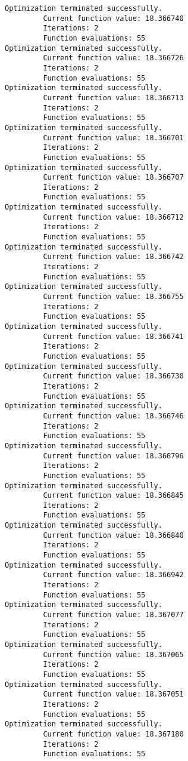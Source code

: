 \documentclass[11pt]{article}
\begin{document}
\begin{Verbatim}[commandchars=\\\{\}]
Optimization terminated successfully.
         Current function value: 18.366740
         Iterations: 2
         Function evaluations: 55
Optimization terminated successfully.
         Current function value: 18.366726
         Iterations: 2
         Function evaluations: 55
Optimization terminated successfully.
         Current function value: 18.366713
         Iterations: 2
         Function evaluations: 55
Optimization terminated successfully.
         Current function value: 18.366701
         Iterations: 2
         Function evaluations: 55
Optimization terminated successfully.
         Current function value: 18.366707
         Iterations: 2
         Function evaluations: 55
Optimization terminated successfully.
         Current function value: 18.366712
         Iterations: 2
         Function evaluations: 55
Optimization terminated successfully.
         Current function value: 18.366742
         Iterations: 2
         Function evaluations: 55
Optimization terminated successfully.
         Current function value: 18.366755
         Iterations: 2
         Function evaluations: 55
Optimization terminated successfully.
         Current function value: 18.366741
         Iterations: 2
         Function evaluations: 55
Optimization terminated successfully.
         Current function value: 18.366730
         Iterations: 2
         Function evaluations: 55
Optimization terminated successfully.
         Current function value: 18.366746
         Iterations: 2
         Function evaluations: 55
Optimization terminated successfully.
         Current function value: 18.366796
         Iterations: 2
         Function evaluations: 55
Optimization terminated successfully.
         Current function value: 18.366845
         Iterations: 2
         Function evaluations: 55
Optimization terminated successfully.
         Current function value: 18.366840
         Iterations: 2
         Function evaluations: 55
Optimization terminated successfully.
         Current function value: 18.366942
         Iterations: 2
         Function evaluations: 55
Optimization terminated successfully.
         Current function value: 18.367077
         Iterations: 2
         Function evaluations: 55
Optimization terminated successfully.
         Current function value: 18.367065
         Iterations: 2
         Function evaluations: 55
Optimization terminated successfully.
         Current function value: 18.367051
         Iterations: 2
         Function evaluations: 55
Optimization terminated successfully.
         Current function value: 18.367180
         Iterations: 2
         Function evaluations: 55

\end{Verbatim}
\end{document}
